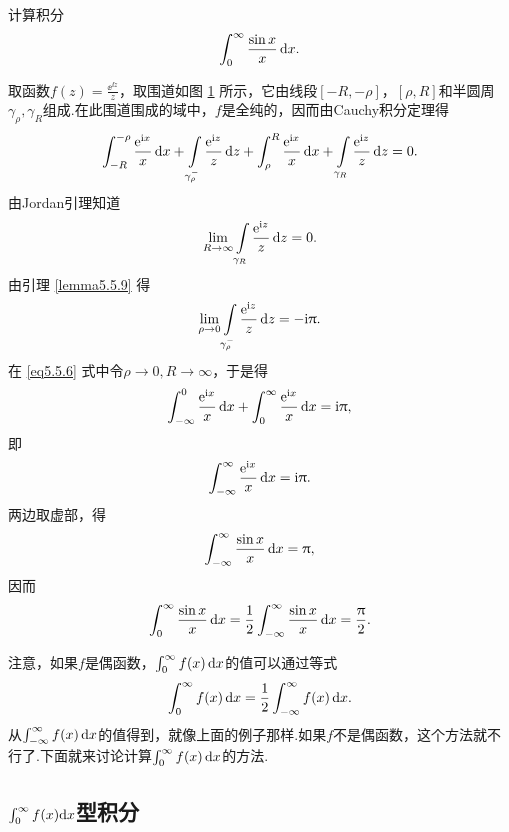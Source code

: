 \begin{example}\label{exam5.5.10}
计算积分
\[\int_0^\infty\frac{\sin x}x\mathop{}\!\mathrm dx.\]
\end{example}
\begin{figure}[!ht]
\centering
{}
\caption{\label{fig5.3}}
\end{figure}
\begin{solution}
取函数$f(z)=\frac{\ee^{\ii z}}z$，取围道如图 \ref{fig5.3} 所示，它由线段$[-R,-\rho]$，$[\rho,R]$和半圆周$\gamma_\rho,\gamma_R$组成.在此围道围成的域中，$f$是全纯的，因而由Cauchy积分定理得
\begin{equation}\label{eq5.5.6}
\int_{-R}^{-\rho}\frac{\ee^{\ii x}}x\dx+\int\limits_{\gamma_\rho^-}\frac{\ee^{\ii z}}z\dz+\int_\rho^R\frac{\ee^{\ii x}}x\dx+\int\limits_{\gamma_R}\frac{\ee^{\ii z}}z\dz=0.
\end{equation}
由Jordan引理知道
\[\lim_{R\to\infty}\int\limits_{\gamma_R}\frac{\operatorname{\!\!\;\mathrm e}^{\mathrm i z}}z\mathop{}\!\mathrm dz=0.\]
由引理 \ref{lemma5.5.9} 得
\[\lim_{\rho\to0}\int\limits_{\gamma_\rho^-}\frac{\operatorname{\!\!\;\mathrm e}^{\mathrm i z}}z\mathop{}\!\mathrm dz=-\mathrm i\uppi.\]
在 \eqref{eq5.5.6} 式中令$\rho\to0,R\to\infty$，于是得
\[\int_{-\infty}^0\frac{\operatorname{\!\!\;\mathrm e}^{\mathrm i x}}x\mathop{}\!\mathrm dx+\int_0^\infty\frac{\operatorname{\!\!\;\mathrm e}^{\mathrm i x}}x\mathop{}\!\mathrm dx=\mathrm i\uppi,\]
即
\[\int_{-\infty}^\infty\frac{\operatorname{\!\!\;\mathrm e}^{\mathrm i x}}x\mathop{}\!\mathrm dx=\mathrm i\uppi.\]
两边取虚部，得
\[\int_{-\infty}^\infty\frac{\sin x}x\mathop{}\!\mathrm dx=\uppi,\]
因而
\begin{equation*}
\int_0^\infty\frac{\sin x}x\mathop{}\!\mathrm dx=\frac12\int_{-\infty}^\infty\frac{\sin x}x\mathop{}\!\mathrm dx=\frac{\uppi}2.
\end{equation*}
\end{solution}

注意，如果$f$是偶函数，$\int_0^\infty f(x)\mathop{}\!\mathrm dx$的值可以通过等式
\[\int_0^\infty f(x)\mathop{}\!\mathrm dx=\frac12\int_{-\infty}^\infty f(x)\mathop{}\!\mathrm dx.\]
从$\int_{-\infty}^\infty f(x)\mathop{}\!\mathrm dx$的值得到，就像上面的例子那样.如果$f$不是偶函数，这个方法就不行了.下面就来讨论计算$\int_0^\infty f(x)\mathop{}\!\mathrm dx$的方法.

\subsection{\mbox{$\int_0^\infty f(x){\normalfont\textrm d}x$}型积分\protect\hypertarget{sec5.5.2}{}}

